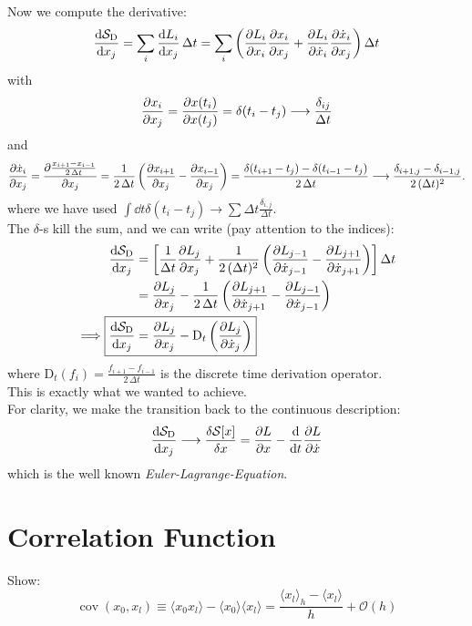 \documentclass[11pt,a4paper]{scrartcl}
\newcommand{\SD}{\ensuremath{\mathcal{S}_{\mathrm{D}}}}
\newcommand{\xdoti}{\ensuremath{\dot{x}_i}}
\newcommand{\xdotj}{\ensuremath{\dot{x}_j}}
\newcommand{\xdotjm}{\ensuremath{\dot{x}_{j-1}}}
\newcommand{\deltaij}{\ensuremath{\delta_{ij}}}
\newcommand{\OverDeltaT}[1]{\ensuremath{\frac{#1}{\Delta t}}}
\newcommand{\DT}{\ensuremath{\mathrm{D}_t}}
\newcommand{\OverTwoDeltaT}[1]{\ensuremath{\frac{#1}{2\, \Delta t}}}
\newcommand{\xdotjp}{\ensuremath{\dot{x}_{j+1}}}
\newcommand{\avg}[1]{\langle#1\rangle}
\newcommand{\BigO}[1]{\mathcal{O}\left(#1\right)}
\DeclareMathOperator{\cov}{cov}
\begin{document}
Now we compute the derivative:
\begin{equation*}
    \dv{\SD}{x_j} =\sum_i\dv{L_i}{x_j}\,\Delta t
    =\sum_i\left(\pdv{L_i}{x_i}\pdv{x_i}{x_j}+\pdv{L_i}{\xdoti}\pdv{\xdoti}{x_j}\right)
    \Delta t
\end{equation*}
with
\begin{equation*}
    \pdv{x_i}{x_j}=\pdv{x(t_i)}{x(t_j)}=\delta(t_i-t_j)\longrightarrow\OverDeltaT{\deltaij}
\end{equation*}
and
\begin{align*}
    \pdv{\xdoti}{x_j}=\pdv{\OverTwoDeltaT{x_{i+1}-x_{i-1}}}{x_j}
    =\OverTwoDeltaT{1}\left(\pdv{x_{i+1}}{x_j}-\pdv{x_{i-1}}{x_j}\right)
    =\OverTwoDeltaT{\delta(t_{i+1}-t_j)-\delta(t_{i-1}-t_j)}
    \longrightarrow\frac{\delta_{i+1,j}-\delta_{i-1,j}}{2\,(\Delta t)^2}.
\end{align*}
where we have used $\int\dd{t}\delta(t_i-t_j)\longrightarrow\sum\Delta{t}\frac{\delta_{i, j}}{\Delta{t}}$.\\

The $\delta$-s kill the sum, and we can write (pay attention to the indices):
\begin{align*}
    \dv{\SD}{x_j}&=\left[\OverDeltaT{1}\pdv{L_j}{x_j}+\frac{1}{2\,(\Delta{t})^2}
    \left(\pdv{L_{j-1}}{\xdotjm}-\pdv{L_{j+1}}{\xdotjp}\right)\right]\Delta{t}\\
    &=\pdv{L_j}{x_j}-\OverTwoDeltaT{1}\left(\pdv{L_{j+1}}{\xdotjp}-\pdv{L_{j-1}}{\xdotjm}\right)\\
    \implies\Aboxed{\dv{\SD}{x_j}&=\pdv{L_j}{x_j}-\DT\left(\pdv{L_{j}}{\xdotj}\right)}
\end{align*}
where $\DT(f_i)=\OverTwoDeltaT{f_{i+1}-f_{i-1}}$ is the discrete time derivation
operator.\\
This is exactly what we wanted to achieve.\\

For clarity, we make the transition back to the continuous description:
\begin{equation*}
    \dv{\SD}{x_j}\longrightarrow\fdv{\mathcal{S}[x]}{x}=\pdv{L}{x}-\dv{t}\pdv{L}{\dot{x}}
\end{equation*}
which is the well known \emph{Euler-Lagrange-Equation}.


\section*{Correlation Function}
Show:
\begin{equation*}
    \cov(x_0, x_l) \equiv \avg{x_0 x_l}-\avg{x_0}\avg{x_l}
    = \frac{\avg{x_l}_h-\avg{x_l}}{h}+\BigO{h}
\end{equation*}
\end{document}
